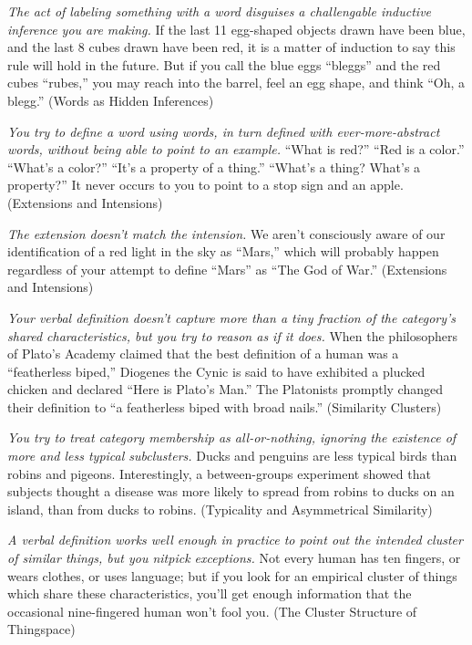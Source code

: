 {
 \textit{The act of labeling something with a word disguises a
challengable inductive inference you are making.} If the last 11
egg-shaped objects drawn have been blue, and the last 8 cubes drawn
have been red, it is a matter of induction to say this rule will hold
in the future. But if you call the blue eggs
``bleggs'' and the red cubes
``rubes,'' you may reach into the
barrel, feel an egg shape, and think ``Oh, a
blegg.'' (Words as Hidden Inferences)}

{
 \textit{You try to define a word using words, in turn defined with
ever-more-abstract words, without being able to point to an example.}
``What is red?''
``Red is a color.''
``What's a color?''
``It's a property of a
thing.'' ``What's a
thing? What's a property?'' It never
occurs to you to point to a stop sign and an apple. (Extensions and
Intensions)}

{
 \textit{The extension doesn't match the
intension.} We aren't consciously aware of our
identification of a red light in the sky as
``Mars,'' which will probably happen
regardless of your attempt to define
``Mars'' as ``The
God of War.'' (Extensions and Intensions)}

{
 \textit{Your verbal definition doesn't capture
more than a tiny fraction of the category's shared
characteristics, but you try to reason as if it does.} When the
philosophers of Plato's Academy claimed that the best
definition of a human was a ``featherless
biped,'' Diogenes the Cynic is said to have exhibited
a plucked chicken and declared ``Here is
Plato's Man.'' The Platonists
promptly changed their definition to ``a featherless
biped with broad nails.'' (Similarity Clusters)}

{
 \textit{You try to treat category membership as all-or-nothing,
ignoring the existence of more and less typical subclusters.} Ducks and
penguins are less typical birds than robins and pigeons. Interestingly,
a between-groups experiment showed that subjects thought a disease was
more likely to spread from robins to ducks on an island, than from
ducks to robins. (Typicality and Asymmetrical Similarity)}

{
 \textit{A verbal definition works well enough in practice to point
out the intended cluster of similar things, but you nitpick
exceptions.} Not every human has ten fingers, or wears clothes, or uses
language; but if you look for an empirical cluster of things which
share these characteristics, you'll get enough
information that the occasional nine-fingered human
won't fool you. (The Cluster Structure of Thingspace)}

